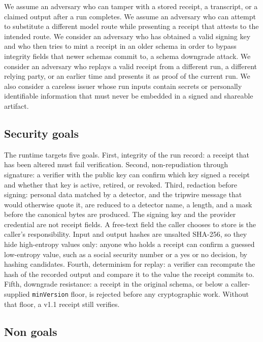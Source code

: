 \documentclass[conference]{IEEEtran}
\newcommand{\code}[1]{\texttt{\small #1}}
\begin{document}
We assume an adversary who can tamper with a stored receipt, a transcript, or a
claimed output after a run completes. We assume an adversary who can attempt to
substitute a different model route while presenting a receipt that attests to the
intended route. We consider an adversary who has obtained a valid signing key and who
then tries to mint a receipt in an older schema in order to bypass integrity fields
that newer schemas commit to, a schema downgrade attack. We consider an adversary who
replays a valid receipt from a different run, a different relying party, or an
earlier time and presents it as proof of the current run. We also consider a careless
issuer whose run inputs contain secrets or personally identifiable information that
must never be embedded in a signed and shareable artifact.

\subsection{Security goals}

The runtime targets five goals. First, integrity of the run record: a receipt that
has been altered must fail verification. Second, non-repudiation through signature:
a verifier with the public key can confirm which key signed a receipt and whether
that key is active, retired, or revoked. Third, redaction before signing: personal
data matched by a detector, and the tripwire message that would otherwise quote it, are
reduced to a detector name, a length, and a mask before the canonical bytes are
produced. The signing key and the provider credential are not receipt fields. A
free-text field the caller chooses to store is the caller's responsibility. Input and
output hashes are unsalted SHA-256, so they hide high-entropy values only: anyone who
holds a receipt can confirm a guessed low-entropy value, such as a social security
number or a yes or no decision, by hashing candidates. Fourth, determinism for replay: a
verifier can recompute the hash of the recorded output and compare it to the value the
receipt commits to. Fifth,
downgrade resistance: a receipt in the original schema, or below a caller-supplied
\code{minVersion} floor, is rejected before any cryptographic work. Without that
floor, a v1.1 receipt still verifies.

\subsection{Non goals}
\end{document}
